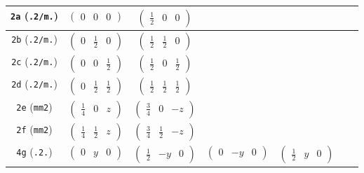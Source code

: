 \documentclass[fleqn,9pt,landscape]{jsarticle}
\begin{document}
\begin{center}
\begin{longtable}{ccccccc}
{\tt 2a} ({\tt .2/m.}) & $ \begin{pmatrix} 0 & 0 & 0 \end{pmatrix} $ & $ \begin{pmatrix} \frac{1}{2} & 0 & 0 \end{pmatrix} $ & $  $ & $  $ & $  $ & $  $ \\ \hline
{\tt 2b} ({\tt .2/m.}) & $ \begin{pmatrix} 0 & \frac{1}{2} & 0 \end{pmatrix} $ & $ \begin{pmatrix} \frac{1}{2} & \frac{1}{2} & 0 \end{pmatrix} $ & $  $ & $  $ & $  $ & $  $ \\ \hline
{\tt 2c} ({\tt .2/m.}) & $ \begin{pmatrix} 0 & 0 & \frac{1}{2} \end{pmatrix} $ & $ \begin{pmatrix} \frac{1}{2} & 0 & \frac{1}{2} \end{pmatrix} $ & $  $ & $  $ & $  $ & $  $ \\ \hline
{\tt 2d} ({\tt .2/m.}) & $ \begin{pmatrix} 0 & \frac{1}{2} & \frac{1}{2} \end{pmatrix} $ & $ \begin{pmatrix} \frac{1}{2} & \frac{1}{2} & \frac{1}{2} \end{pmatrix} $ & $  $ & $  $ & $  $ & $  $ \\ \hline
{\tt 2e} ({\tt mm2}) & $ \begin{pmatrix} \frac{1}{4} & 0 & z \end{pmatrix} $ & $ \begin{pmatrix} \frac{3}{4} & 0 & - z \end{pmatrix} $ & $  $ & $  $ & $  $ & $  $ \\ \hline
{\tt 2f} ({\tt mm2}) & $ \begin{pmatrix} \frac{1}{4} & \frac{1}{2} & z \end{pmatrix} $ & $ \begin{pmatrix} \frac{3}{4} & \frac{1}{2} & - z \end{pmatrix} $ & $  $ & $  $ & $  $ & $  $ \\ \hline
{\tt 4g} ({\tt .2.}) & $ \begin{pmatrix} 0 & y & 0 \end{pmatrix} $ & $ \begin{pmatrix} \frac{1}{2} & - y & 0 \end{pmatrix} $ & $ \begin{pmatrix} 0 & - y & 0 \end{pmatrix} $ & $ \begin{pmatrix} \frac{1}{2} & y & 0 \end{pmatrix} $ & $  $ & $  $ \\ \hline

\end{longtable}
\end{center}
\end{document}
